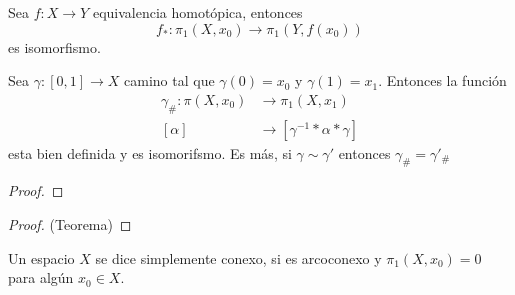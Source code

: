 \documentclass{article}
\begin{document}
\begin{teo}
    Sea $f:X\to Y$ equivalencia homotópica, entonces
    \begin{equation*}
        f_{*}:\pi_{1}(X,x_{0})\to\pi_{1}(Y,f(x_{0}))
    \end{equation*}
    es isomorfismo.
\end{teo}

\begin{lema}
    Sea $\gamma:[0,1]\to X$ camino tal que $\gamma(0)=x_{0}$ y $\gamma(1)=x_{1}$. Entonces la 
    función
    \begin{align*}
        \gamma_{\#}:\pi(X,x_{0}) &\to \pi_{1}(X,x_{1}) \\
        [\alpha] &\to [\gamma^{-1}*\alpha*\gamma]
    \end{align*}
    esta bien definida y es isomorifsmo. Es más, si $\gamma\sim\gamma'$ entonces $\gamma_{\#}
    =\gamma'_{\#}$
\end{lema}

\begin{proof}
    
\end{proof}

\begin{proof} (Teorema)
    
\end{proof}

\begin{dfn}
    Un espacio $X$ se dice simplemente conexo, si es arcoconexo y $\pi_{1}(X,x_{0})=0$ para algún 
    $x_{0}\in X$.
\end{dfn}

\end{document}
